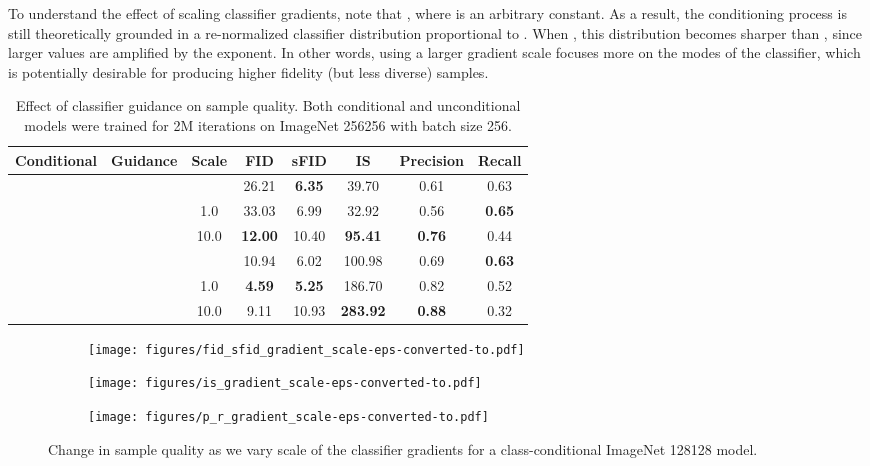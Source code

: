 \documentclass{article}
\newcommand{\cmark}{\ding{51}}\newcommand{\xmark}{\ding{55}}
\begin{document}
To understand the effect of scaling classifier gradients, note that , where  is an arbitrary constant. As a result, the conditioning process is still theoretically grounded in a re-normalized classifier distribution proportional to . When , this distribution becomes sharper than , since larger values are amplified by the exponent. In other words, using a larger gradient scale focuses more on the modes of the classifier, which is potentially desirable for producing higher fidelity (but less diverse) samples.

\begin{table}[t]
    \begin{center}
    \begin{small}
    \begin{tabular}{cccccccc}
    \toprule
    Conditional & Guidance & Scale & FID   & sFID  & IS     & Precision & Recall  \\
    \midrule
    \xmark      & \xmark   &       & 26.21 & \bf 6.35  & 39.70  & 0.61      & 0.63 \\
    \xmark      & \cmark   & 1.0   & 33.03 & 6.99  & 32.92  & 0.56      & \bf 0.65 \\
    \xmark      & \cmark   & 10.0  & \bf 12.00 & 10.40 & \bf 95.41  & \bf 0.76      & 0.44 \\
    \hline
    \cmark      & \xmark   &       & 10.94 & 6.02  & 100.98 & 0.69      & \bf 0.63 \\ 
    \cmark      & \cmark   & 1.0   & \bf 4.59  & \bf 5.25  & 186.70 & 0.82      & 0.52 \\
    \cmark      & \cmark   & 10.0  & 9.11 &	10.93  & \bf 283.92  & \bf 0.88      & 0.32 \\
    \bottomrule
    \end{tabular}
    \end{small}
    \end{center}
    \caption{Effect of classifier guidance on sample quality. Both conditional and unconditional models were trained for 2M iterations on ImageNet 256256 with batch size 256.}
    \label{tab:guide}
    \vskip -0.2in
\end{table}

\begin{figure}[t]
    \begin{center}
    \begin{subfigure}{0.32\textwidth}
        \centerline{\texttt{[image: figures/fid\_sfid\_gradient\_scale-eps-converted-to.pdf]}}
    \end{subfigure}
    \begin{subfigure}{0.32\textwidth}
        \centerline{\texttt{[image: figures/is\_gradient\_scale-eps-converted-to.pdf]}}
    \end{subfigure}
    \begin{subfigure}{0.32\textwidth}
        \centerline{\texttt{[image: figures/p\_r\_gradient\_scale-eps-converted-to.pdf]}}
    \end{subfigure}
    \end{center}
    \caption{Change in sample quality as we vary scale of the classifier gradients for a class-conditional ImageNet 128128 model.} 
    \label{fig:guidescale}
\end{figure}
\end{document}

